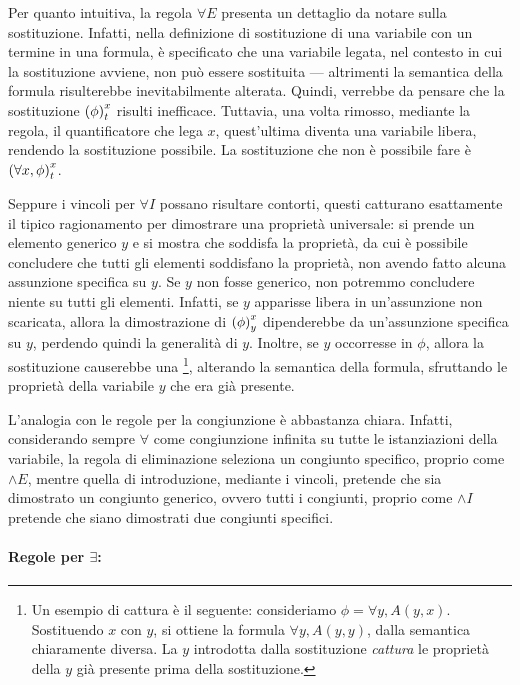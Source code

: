 Per quanto intuitiva, la regola \(\forall E\) presenta un dettaglio da notare sulla sostituzione. 
Infatti, nella definizione di sostituzione di una variabile con un termine in una formula, è specificato che una variabile legata, nel contesto in cui la sostituzione avviene, non può essere sostituita --- altrimenti la semantica della formula risulterebbe inevitabilmente alterata.
Quindi, verrebbe da pensare che la sostituzione \({{\left(\phi\right)}^{x}_{t}}\) risulti inefficace.
Tuttavia, una volta rimosso, mediante la regola, il quantificatore che lega \(x\), quest'ultima diventa una variabile libera, rendendo la sostituzione possibile.
La sostituzione che non è possibile fare è \({{\left(\forall x,\phi\right)}^{x}_{t}}\).

Seppure i vincoli per \(\forall I\) possano risultare contorti, questi catturano esattamente il tipico ragionamento per dimostrare una proprietà universale: si prende un elemento generico \(y\) e si mostra che soddisfa la proprietà, da cui è possibile concludere che tutti gli elementi soddisfano la proprietà, non avendo fatto alcuna assunzione specifica su \(y\). Se \(y\) non fosse generico, non potremmo concludere niente su tutti gli elementi.
Infatti, se \(y\) apparisse libera in un'assunzione non scaricata, allora la dimostrazione di \({{\left(\phi\right)}^{x}_{y}}\) dipenderebbe da un'assunzione specifica su \(y\), perdendo quindi la generalità di \(y\). 
Inoltre, se \(y\) occorresse in \(\phi\), allora la sostituzione causerebbe una \footnote{Un esempio di cattura è il seguente: consideriamo \(\phi = \forall y, A(y,x)\). Sostituendo \(x\) con \(y\), si ottiene la formula \(\forall y, A(y,y)\), dalla semantica chiaramente diversa. La \(y\) introdotta dalla sostituzione \emph{cattura} le proprietà della \(y\) già presente prima della sostituzione.}, alterando la semantica della formula, sfruttando le proprietà della variabile \(y\) che era già presente.

L'analogia con le regole per la congiunzione è abbastanza chiara. Infatti, considerando sempre \(\forall\) come congiunzione infinita su tutte le istanziazioni della variabile, la regola di eliminazione seleziona un congiunto specifico, proprio come \(\land E\), mentre quella di introduzione, mediante i vincoli, pretende che sia dimostrato un congiunto generico, ovvero tutti i congiunti, proprio come \(\land I\) pretende che siano dimostrati due congiunti specifici.

\paragraph{Regole per \(\exists\):}

